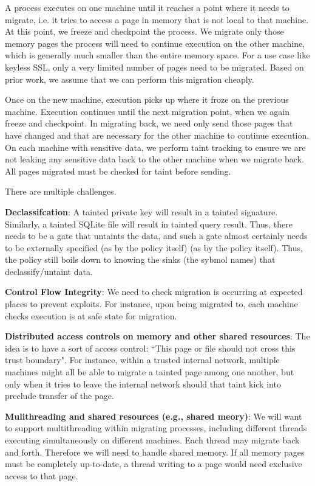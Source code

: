 A process executes on one machine until it reaches a point where it needs to
migrate, i.e. it tries to access a page in memory that is not local to that
machine.  At this point, we freeze and checkpoint the process.  We migrate only
those memory pages the process will need to continue execution on the other
machine, which is generally much smaller than the entire memory space.  For a
use case like keyless SSL, only a very limited number of pages need to be
migrated.  Based on prior work, we assume that we can perform this migration
cheaply. 

Once on the new machine, execution picks up where it froze on the previous
machine.  Execution continues until the next migration point, when we again
freeze and checkpoint.  In migrating back, we need only send those pages that
have changed and that are necessary for the other machine to continue
execution.  On each machine with sensitive data, we perform taint tracking to
ensure we are not leaking any sensitive data back to the other machine when we
migrate back.  All pages migrated must be checked for taint before sending.


There are multiple challenges.


\textbf{Declassifcation}: 
%
A tainted private key will result in a tainted signature.
%
Similarly, a tainted SQLite file will result in tainted query result.
%
Thus, there needs to be a gate that untaints the data, and such a gate almost
certainly needs to be externally specified (as by the policy itself) (as by the
policy itself).  
% 
Thus, the policy still boils down to knowing the sinks (the sybmol names) that
declassify/untaint data.


\textbf{Control Flow Integrity}:
%
We need to check migration is occurring at expected places to prevent exploits.  
% 
For instance, upon being migrated to, each machine checks execution is at safe
state for migration.


\textbf{Distributed access controls on memory and other shared resources}:
%
The idea is to have a sort of access control: ``This page or file should not cross
this trust boundary". 
%
For instance, within a trusted internal network, multiple machines might all be
able to migrate a tainted page among one another, but only when it tries to
leave the internal network should that taint kick into preclude transfer of the
page.


\textbf{Mulithreading and shared resources (e.g., shared meory)}:
%
We will want to support multithreading within migrating processes, including
different threads executing simultaneously on different machines.
%
Each thread may migrate back and forth. 
% 
Therefore we will need to handle shared memory. 
%
If all memory pages must be completely up-to-date, a thread writing to a page
would need exclusive access to that page.


